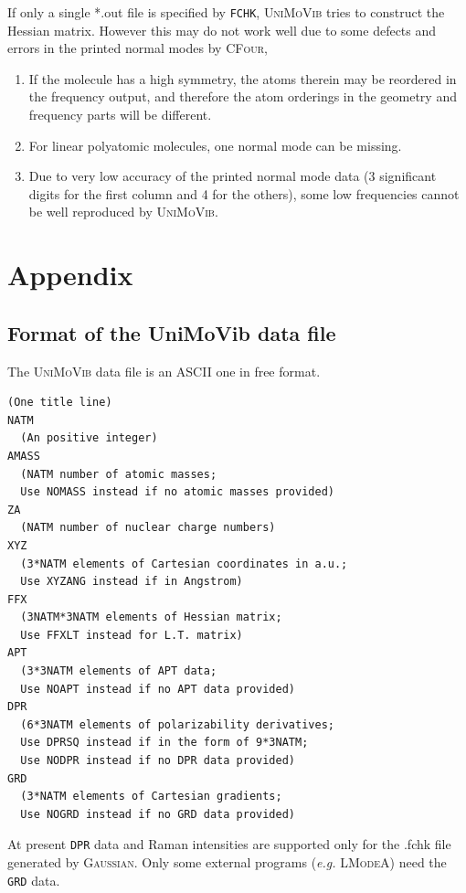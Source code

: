 \documentclass[12pt,english]{extarticle}
\begin{document}
\begin{itemize}
If only a single *.out file is specified by \verb|FCHK|, \textsc{UniMoVib} tries to construct the Hessian matrix. However this may do not work well due to some defects and errors in the printed normal modes by \textsc{CFour},
  \begin{enumerate}
    \item If the molecule has a high symmetry, the atoms therein may be reordered in the frequency output, and therefore the atom orderings in the geometry and frequency parts will be different.
    \item For linear polyatomic molecules, one normal mode can be missing.
    \item Due to very low accuracy of the printed normal mode data (3 significant digits for the first column and 4 for the others), some low frequencies cannot be well reproduced by \textsc{UniMoVib}.
  \end{enumerate}

\end{itemize}


\pagebreak{}

\appendix
\section{Appendix} \label{part:appdx}

\subsection{Format of the UniMoVib data file} \label{sec:almfmt}

The \textsc{UniMoVib} data file is an ASCII one in free format.
\begin{Verbatim}[frame=single,label=Format(Ver.1.0.3 2020.02.10),labelposition=topline,rulecolor=\color{green},fontsize=\small,baselinestretch=1.0]
(One title line)
NATM
  (An positive integer)
AMASS
  (NATM number of atomic masses;
  Use NOMASS instead if no atomic masses provided)
ZA
  (NATM number of nuclear charge numbers)
XYZ
  (3*NATM elements of Cartesian coordinates in a.u.;
  Use XYZANG instead if in Angstrom)
FFX
  (3NATM*3NATM elements of Hessian matrix;
  Use FFXLT instead for L.T. matrix)
APT
  (3*3NATM elements of APT data;
  Use NOAPT instead if no APT data provided)
DPR
  (6*3NATM elements of polarizability derivatives;
  Use DPRSQ instead if in the form of 9*3NATM;
  Use NODPR instead if no DPR data provided)
GRD
  (3*NATM elements of Cartesian gradients;
  Use NOGRD instead if no GRD data provided)
\end{Verbatim}
At present \verb|DPR| data and Raman intensities are supported only for the .fchk file generated by \textsc{Gaussian}. Only some external programs (\emph{e.g.} \textsc{LModeA}) need the \verb|GRD| data.
\end{document}
